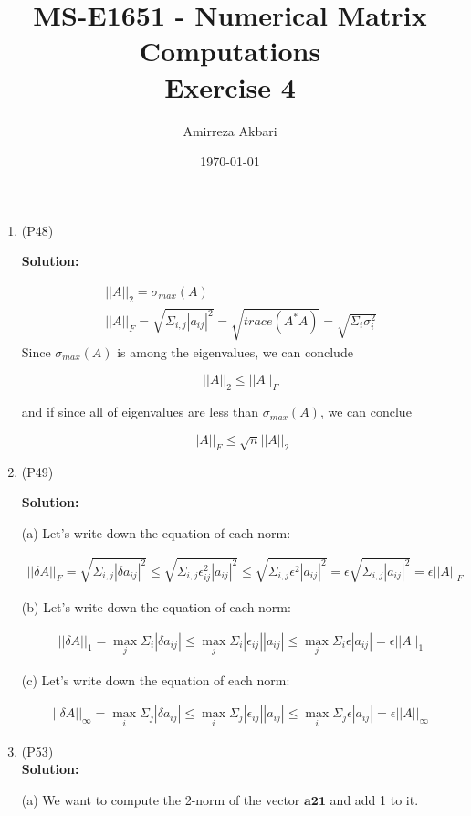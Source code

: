 \documentclass{article}
\title{MS-E1651 - Numerical Matrix Computations
\\Exercise 4}
\author{Amirreza Akbari}
\date{\today}
\begin{document}
\maketitle
\begin{enumerate}[leftmargin=\labelsep]
	\item (P48)
	
	\textbf{Solution:}

	\begin{align}
		||A||_2 = \sigma_{max}(A)\\
		||A||_F = \sqrt{\Sigma_{i,j} |a_{ij}|^2} = \sqrt{trace(A^{*}A)} = \sqrt{\Sigma_{i} \sigma_{i}^2}
	\end{align}
	Since $\sigma_{max}(A)$ is among the eigenvalues, we can conclude 

	$$||A||_2 \leq ||A||_F$$

	and if since all of eigenvalues are less than $\sigma_{max}(A)$, we can conclue 

	$$||A||_F \leq \sqrt{n}||A||_2$$
	\item (P49)
	
	\textbf{Solution:}

	(a) Let's write down the equation of each norm:

	\begin{align}
		||\delta A||_F = \sqrt{\Sigma_{i,j} |\delta a_{ij}|^2} \leq \sqrt{\Sigma_{i,j} \epsilon_{ij}^2|a_{ij}|^2} \leq \sqrt{\Sigma_{i,j} \epsilon^2|a_{ij}|^2} = \epsilon\sqrt{\Sigma_{i,j}|a_{ij}|^2} = \epsilon ||A||_F
	\end{align}

	(b) Let's write down the equation of each norm:

	\begin{align}
		||\delta A||_1 = \max_j{\Sigma_{i} |\delta a_{ij}|} \leq \max_j{\Sigma_{i} |\epsilon_{ij}||a_{ij}|} \leq \max_j{\Sigma_{i} \epsilon|a_{ij}|}  = \epsilon ||A||_1
	\end{align}

	(c) Let's write down the equation of each norm:

	\begin{align}
		||\delta A||_{\infty} = \max_i{\Sigma_{j} |\delta a_{ij}|} \leq \max_i{\Sigma_{j} |\epsilon_{ij}||a_{ij}|} \leq \max_i{\Sigma_{j} \epsilon|a_{ij}|}  = \epsilon ||A||_{\infty}
	\end{align}
	\item (P53)\\[0.5em]
\textbf{Solution:} 
	
(a) We want to compute the 2-norm of the vector $\mathbf{a21}$ and add 1 to it.


\end{enumerate}
\end{document}
